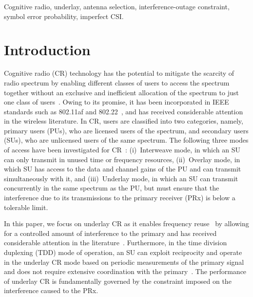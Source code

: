 \documentclass[12pt,draftcls,peerreview,onecolumn]{IEEEtran}
\begin{document}
\begin{IEEEkeywords}
Cognitive radio, underlay, antenna selection, interference-outage constraint, symbol error probability, imperfect CSI.
\end{IEEEkeywords}

\IEEEpeerreviewmaketitle



\section{Introduction}	
\label{sec:intro}

Cognitive radio (CR) technology has the potential to mitigate the scarcity of radio spectrum by enabling different classes of users to access the spectrum together without an exclusive and inefficient allocation of the spectrum to just one class of users~\cite{Goldsmith_2009_PIEEE}. Owing to its promise, it has been incorporated in IEEE standards such as 802.11af and 802.22~\cite{Sherman_2008_TCMAG}, and has received considerable attention in the wireless literature. In CR, users are classified into two categories, namely,   primary users (PUs), who are licensed users of the spectrum, and  secondary users (SUs), who are unlicensed users of the same spectrum. The following three modes of access have been investigated for CR~\cite{Goldsmith_2009_PIEEE}: (i)~Interweave mode, in which an SU can only transmit in unused time or frequency resources, (ii)~Overlay mode, in which SU has access to the data and channel gains of the  PU and can transmit simultaneously with it, and (iii)~Underlay mode, in which an SU can transmit concurrently in the same spectrum as the PU, but must ensure that the interference due to its transmissions to the primary receiver (PRx) is below a tolerable limit. 

In this paper, we focus on underlay CR as it enables frequency reuse~\cite{Zhang_2017_tcom} by allowing for a controlled amount of interference to the primary and has received considerable attention in the literature~\cite{Hanif_2015_globecom,Wang_2010_TWC,RZhang_2009_TWC,Sarvendranath_2013_TCOM,Wang_2011_TCom,Sarvendranath_2014_TCOM, Kashyap_2014_TCOM,Kong_2011_JCN,Fakhan_2014_TSP,Hanif_2017_tcom,Sboui_2013_TWC,Kashyap_2015_wicomlet,li_2011_pimrc}. Furthermore, in the time division duplexing (TDD) mode of operation, an SU can exploit reciprocity and operate in the underlay CR mode based on periodic measurements of the primary signal and does not require extensive coordination with the primary~\cite{Zhang_2017_tcom,Zhao_2008_TSP}. The performance of underlay CR is fundamentally governed by the constraint imposed on the interference caused to the PRx. 
\end{document}

